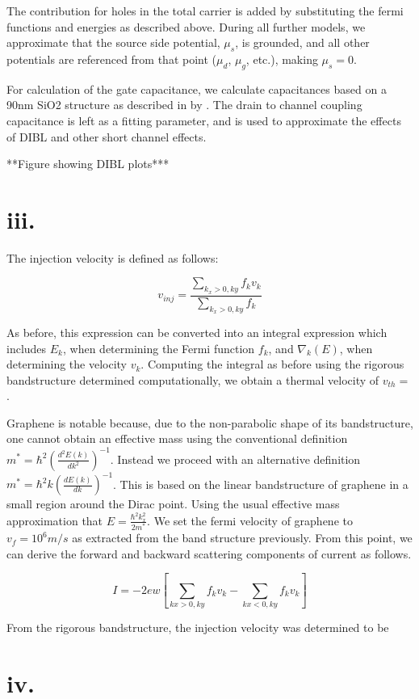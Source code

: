 \documentclass[11pt]{article}
\begin{document}
The contribution for holes in the total carrier is added by substituting the fermi functions and energies as described above. During all further models, we approximate that the source side potential, $\mu_s$, is grounded, and all other potentials are referenced from that point ($\mu_d$, $\mu_g$, etc.), making $\mu_s = 0$. 

For calculation of the gate capacitance, we calculate capacitances based on a 90nm SiO2 structure as described in by \cite{wu2010}. The drain to channel coupling capacitance is left as a fitting parameter, and is used to approximate the effects of DIBL and other short channel effects. 

**Figure showing DIBL plots***

\section*{iii.} The injection velocity is defined as follows:

$$v_{inj} = \frac{\sum_{k_x>0, ky}f_{k}v_{k}}{\sum_{k_x>0, ky}f_{k}}$$

As before, this expression can be converted into an integral expression which includes $E_k$, when determining the Fermi function $f_{k}$, and $\nabla_k(E)$, when determining the velocity $v_{k}$.  Computing the integral as before using the rigorous bandstructure determined computationally, we obtain a thermal velocity of $v_{th} = $. 

Graphene is notable because, due to the non-parabolic shape of its bandstructure, one cannot obtain an effective mass\cite{ariel2012} using the conventional definition $m^{*} = \hbar^2(\frac{d^2E(k)}{dk^2})^{-1}$. Instead we proceed with an alternative definition $m^{*} = \hbar^2k(\frac{dE(k)}{dk})^{-1}$. This is based on the linear bandstructure of graphene in a small region around the Dirac point. Using the usual effective mass approximation that $E=\frac{\hbar^2k_x^2}{2m^{*}}$. We set the fermi velocity of graphene to $v_f = 10^6 m/s$ as extracted from the band structure previously. From this point, we can derive the forward and backward scattering components of current as follows. 

$$I = -2ew[\sum_{kx>0,ky}{f_kv_k} - \sum_{kx<0,ky}{f_kv_k}]$$
\vspace{1em}


From the rigorous bandstructure, the injection velocity was determined to be 

\section*{iv.}
\end{document}
